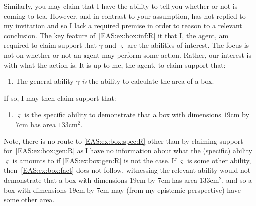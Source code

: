 \begin{note}
{    Similarly, you may claim that I have the ability to tell you whether or not  is coming to tea.
    However, and in contrast to your assumption,  has not replied to my invitation and so I lack a required premise in order to reason to a relevant conclusion.
  }
  The key feature of~\ref{EAS:ex:box:inf:R} it that I, the agent, am required to claim support that \(\gamma\) and \(\varsigma\) are the abilities of interest.
  The focus is not on whether or not an agent may perform some action.
  Rather, our interest is with what the action is.
  It is up to me, the agent, to claim support that:
  \begin{enumerate}[label=\emph{A}\arabic*., ref=(\emph{A}\arabic*), resume*=EAS_counter]
  \item\label{EAS:ex:box:gen:R} The general ability \(\gamma\) \emph{is} the ability to calculate the area of a box.
  \end{enumerate}
  If so, I may then claim support that:
  \begin{enumerate}[label=\emph{A}\arabic*., ref=(\emph{A}\arabic*), resume*=EAS_counter]
  \item\label{EAS:ex:box:spec:R} \(\varsigma\) is the specific ability to demonstrate that a box with dimensions \(19\text{cm}\) by \(7\text{cm}\) has area \(133\text{cm}^{2}\).
  \end{enumerate}
  Note, there is no route to \ref{EAS:ex:box:spec:R} other than by claiming support for~\ref{EAS:ex:box:gen:R} as I have no information about what the (specific) ability \(\varsigma\) is amounts to if \ref{EAS:ex:box:gen:R} is not the case.
  If \(\varsigma\) is some other ability, then~\ref{EAS:ex:box:fact} does not follow, witnessing the relevant ability would not demonstrate that a box with
  dimensions \(19\text{cm}\) by \(7\text{cm}\) has area \(133\text{cm}^{2}\), and so a box with dimensions \(19\text{cm}\) by \(7\text{cm}\) may (from my epistemic perspective) have some other area.
\end{note}

